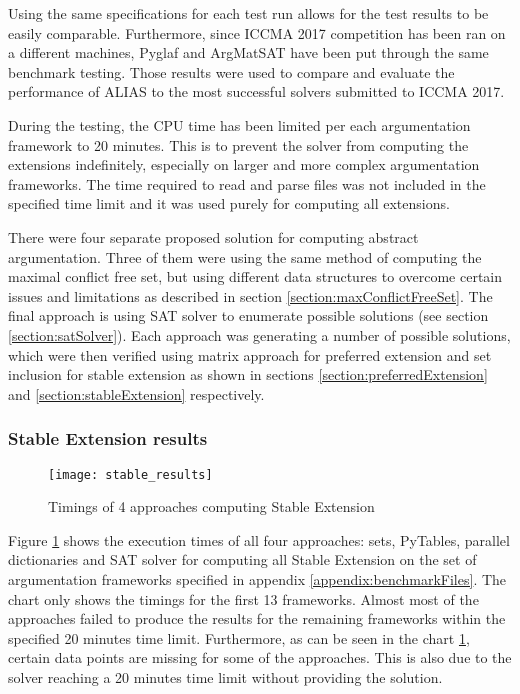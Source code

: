 Using the same specifications for each test run allows for the test results to be easily comparable. Furthermore, since ICCMA 2017 competition has been ran on a different machines, Pyglaf \citep{pyglaf} and ArgMatSAT \citep{argmatSat} have been put through the same benchmark testing. Those results were used to compare and evaluate the performance of ALIAS to the most successful solvers submitted to ICCMA 2017.

During the testing, the CPU time has been limited per each argumentation framework to 20 minutes. This is to prevent the solver from computing the extensions indefinitely, especially on larger and more complex argumentation frameworks. The time required to read and parse files was not included in the specified time limit and it was used purely for computing all extensions. 

There were four separate proposed solution for computing abstract argumentation. Three of them were using the same method of computing the maximal conflict free set, but using different data structures to overcome certain issues and limitations as described in section \ref{section:maxConflictFreeSet}. The final approach is using SAT solver to enumerate possible solutions (see section \ref{section:satSolver}). Each approach was generating a number of possible solutions, which were then verified using matrix approach for preferred extension and set inclusion for stable extension as shown in sections \ref{section:preferredExtension} and \ref{section:stableExtension} respectively. 

\subsubsection{Stable Extension results}

\begin{figure}[h]
	\texttt{[image: stable\_results]}
	\caption{Timings of 4 approaches computing Stable Extension}
	\label{fig:stableFinalResults}
\end{figure}

Figure \ref{fig:stableFinalResults} shows the execution times of all four approaches: sets, PyTables, parallel dictionaries and SAT solver for computing all Stable Extension on the set of argumentation frameworks specified in appendix \ref{appendix:benchmarkFiles}. The chart only shows the timings for the first 13 frameworks. Almost most of the approaches failed to produce the results for the remaining frameworks within the specified 20 minutes time limit. Furthermore, as can be seen in the chart \ref{fig:stableFinalResults}, certain data points are missing for some of the approaches. This is also due to the solver reaching a 20 minutes time limit without providing the solution. 

